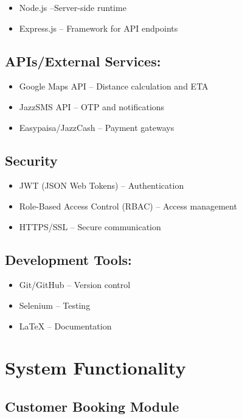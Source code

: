 \documentclass[12pt,a4paper]{article}
\begin{document}
\begin{itemize}
\item Node.js –Server-side runtime
\item Express.js – Framework for API endpoints
\end{itemize}
\subsection{APIs/External Services:}
\begin{itemize}
    \item Google Maps API – Distance calculation and ETA
\item JazzSMS API – OTP and notifications
\item Easypaisa/JazzCash – Payment gateways

\end{itemize}
\subsection{Security}
\begin{itemize}
    \item JWT (JSON Web Tokens) – Authentication
 \item Role-Based Access Control (RBAC) – Access management
  \item HTTPS/SSL – Secure communication

\end{itemize}

\subsection{Development Tools:}
\begin{itemize}
    \item Git/GitHub – Version control
\item Selenium – Testing
\item LaTeX – Documentation

\end{itemize}



\section{System Functionality}

\subsection{Customer Booking Module}
\end{document}
